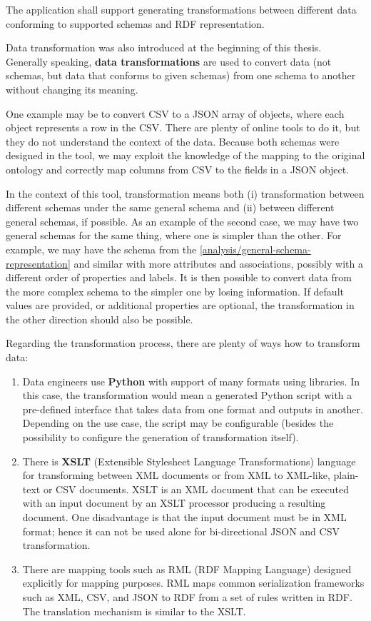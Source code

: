 \begin{requirement}
    The application shall support generating transformations between different data conforming to supported schemas and RDF representation.
\end{requirement}

Data transformation was also introduced at the beginning of this thesis. Generally speaking, \textbf{data transformations} are used to convert data (not schemas, but data that conforms to given schemas) from one schema to another without changing its meaning.

One example may be to convert CSV to a JSON array of objects, where each object represents a row in the CSV. There are plenty of online tools to do it, but they do not understand the context of the data. Because both schemas were designed in the tool, we may exploit the knowledge of the mapping to the original ontology and correctly map columns from CSV to the fields in a JSON object.

In the context of this tool, transformation means both (i) transformation between different schemas under the same general schema and (ii) between different general schemas, if possible. As an example of the second case, we may have two general schemas for the same thing, where one is simpler than the other. For example, we may have the schema from the \autoref{analysis/general-schema-representation} and similar with more attributes and associations, possibly with a different order of properties and labels. It is then possible to convert data from the more complex schema to the simpler one by losing information. If default values are provided, or additional properties are optional, the transformation in the other direction should also be possible.

\medskip

Regarding the transformation process, there are plenty of ways how to transform data:
\begin{enumerate}
    \item Data engineers use \textbf{Python} with support of many formats using libraries. In this case, the transformation would mean a generated Python script with a pre-defined interface that takes data from one format and outputs in another. Depending on the use case, the script may be configurable (besides the possibility to configure the generation of transformation itself).
    \item There is \textbf{XSLT} (Extensible Stylesheet Language Transformations) language for transforming between XML documents or from XML to XML-like, plain-text or CSV documents. XSLT is an XML document that can be executed with an input document by an XSLT processor producing a resulting document. One disadvantage is that the input document must be in XML format; hence it can not be used alone for bi-directional JSON and CSV transformation.
    \item There are mapping tools such as RML \cite{dimou2014rml} (RDF Mapping Language) designed explicitly for mapping purposes. RML maps common serialization frameworks such as XML, CSV, and JSON to RDF from a set of rules written in RDF. The translation mechanism is similar to the XSLT.
\end{enumerate}

